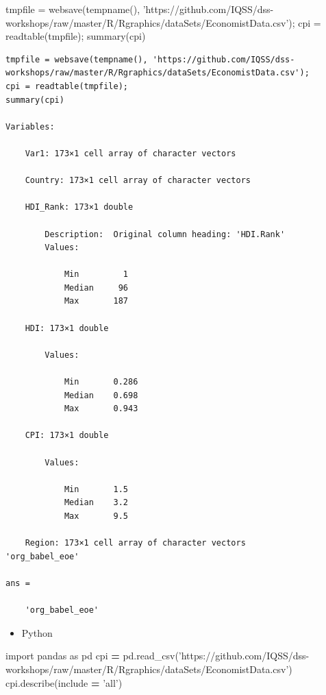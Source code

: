\documentclass[]{book}
\newenvironment{Shaded}{\begin{snugshade}}{\end{snugshade}}
\newcommand{\StringTok}[1]{\textcolor[rgb]{0.31,0.60,0.02}{#1}}
\newcommand{\ImportTok}[1]{#1}
\newcommand{\OperatorTok}[1]{\textcolor[rgb]{0.81,0.36,0.00}{\textbf{#1}}}
\newcommand{\NormalTok}[1]{#1}
\providecommand{\tightlist}{%
  \setlength{\itemsep}{0pt}\setlength{\parskip}{0pt}}
\begin{document}
\begin{Shaded}
\begin{Highlighting}[]
\NormalTok{tmpfile = websave(tempname(), }\StringTok{'https://github.com/IQSS/dss-workshops/raw/master/R/Rgraphics/dataSets/EconomistData.csv'}\NormalTok{);}
\NormalTok{cpi = readtable(tmpfile);}
\NormalTok{summary(cpi)}
\end{Highlighting}
\end{Shaded}

\begin{verbatim}
tmpfile = websave(tempname(), 'https://github.com/IQSS/dss-workshops/raw/master/R/Rgraphics/dataSets/EconomistData.csv');
cpi = readtable(tmpfile);
summary(cpi)

Variables:

    Var1: 173×1 cell array of character vectors

    Country: 173×1 cell array of character vectors

    HDI_Rank: 173×1 double

        Description:  Original column heading: 'HDI.Rank'
        Values:

            Min         1       
            Median     96       
            Max       187       

    HDI: 173×1 double

        Values:

            Min       0.286
            Median    0.698
            Max       0.943

    CPI: 173×1 double

        Values:

            Min       1.5  
            Median    3.2  
            Max       9.5  

    Region: 173×1 cell array of character vectors
'org_babel_eoe'

ans =

    'org_babel_eoe'
\end{verbatim}

\begin{itemize}
\tightlist
\item
  Python
\end{itemize}

\begin{Shaded}
\begin{Highlighting}[]
\ImportTok{import}\NormalTok{ pandas }\ImportTok{as}\NormalTok{ pd}
\NormalTok{cpi }\OperatorTok{=}\NormalTok{ pd.read_csv(}\StringTok{'https://github.com/IQSS/dss-workshops/raw/master/R/Rgraphics/dataSets/EconomistData.csv'}\NormalTok{)}
\NormalTok{cpi.describe(include }\OperatorTok{=} \StringTok{'all'}\NormalTok{)}
\end{Highlighting}
\end{Shaded}
\end{document}
